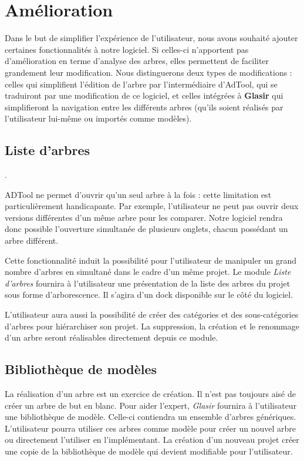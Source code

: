 \section{Amélioration}


	Dans le but de simplifier l'expérience de l'utilisateur, nous avons souhaité ajouter certaines fonctionnalités à notre logiciel. Si celles-ci n'apportent pas d'amélioration en terme d'analyse des arbres, elles permettent de faciliter grandement leur modification. Nous distinguerons deux types de modifications : celles qui simplifient l'édition de l'arbre par l’intermédiaire d'AdTool, qui se traduiront par une modification de ce logiciel, et celles intégrées à \textbf{Glasir} qui simplifieront la navigation entre les différents arbres (qu'ils soient réalisés par l'utilisateur lui-même ou importés comme modèles). 

	\subsection{Liste d'arbres}.

	ADTool ne permet d'ouvrir qu'un seul arbre à la fois : cette limitation est particulièrement handicapante. Par exemple, l'utilisateur ne peut pas ouvrir deux versions différentes d'un même arbre pour les comparer. Notre logiciel rendra donc possible l'ouverture simultanée de plusieurs onglets, chacun possédant un arbre différent. 

	Cette fonctionnalité induit la possibilité pour l'utilisateur de manipuler un grand nombre d'arbres en simultané dans le cadre d'un même projet. Le module \emph{Liste d'arbres} fournira à l'utilisateur une présentation de la liste des arbres du projet sous forme d'arborescence. Il s'agira d'un dock disponible sur le côté du logiciel. 

	L'utilisateur aura aussi la possibilité de créer des catégories et des sous-catégories d'arbres pour hiérarchiser son projet. La suppression, la création et le renommage d'un arbre seront réalisables directement depuis ce module. 

	\subsection{Bibliothèque de modèles}


	La réalisation d'un arbre est un exercice de création. Il n'est pas toujours aisé de créer un arbre de but en blanc. Pour aider l'expert, \emph{Glasir} fournira à l'utilisateur une bibliothèque de modèle. Celle-ci contiendra un ensemble d'arbres génériques. L'utilisateur pourra utiliser ces arbres comme modèle pour créer un nouvel arbre ou directement l'utiliser en l'implémentant. La création d'un nouveau projet créer une copie de la bibliothèque de modèle qui devient modifiable pour l'utilisateur.		

